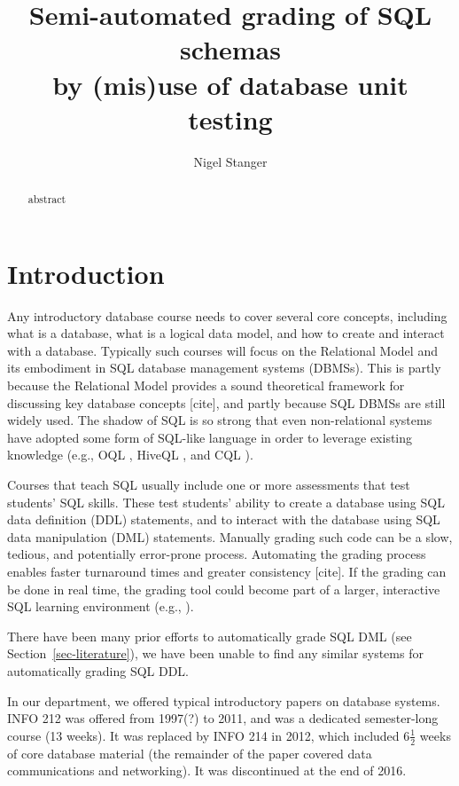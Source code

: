 \documentclass[sigconf, authordraft]{acmart}
\title{Semi-automated grading of SQL schemas \\ by (mis)use of database unit testing}
\author{Nigel Stanger}
\affiliation{
    \institution{University of Otago}
    \department{Department of Information Science}
    \city{Dunedin}
    \country{New Zealand}
}
\begin{document}
\begin{abstract}
    abstract
\end{abstract}

\maketitle


\section{Introduction}

Any introductory database course needs to cover several core concepts, including what is a database, what is a logical data model, and how to create and interact with a database. Typically such courses will focus on the Relational Model and its embodiment in SQL database management systems (DBMSs). This is partly because the Relational Model provides a sound theoretical framework for discussing key database concepts [cite], and partly because SQL DBMSs are still widely used. The shadow of SQL is so strong that even non-relational systems have adopted some form of SQL-like language in order to leverage existing knowledge (e.g., OQL \cite{Cattell.R-2000a-ODMG3}, HiveQL \cite{Apache-2017a-Hive}, and CQL \cite{Apache-2017a-CQL}).

Courses that teach SQL usually include one or more assessments that test students' SQL skills. These test students' ability to 
create a database using SQL data definition (DDL) statements, and to interact with the database using SQL data manipulation (DML) statements. Manually grading such code can be a slow, tedious, and potentially error-prone process. Automating the grading process enables faster turnaround times and greater consistency [cite]. If the grading can be done in real time, the grading tool could become part of a larger, interactive SQL learning environment (e.g.,  \cite{Kenny.C-2005a-Automated,Kleiner.C-2013a-Automated,Mitrovic.A-1998a-Learning,Russell.G-2004a-Improving,Sadiq.S-2004a-SQLator}).

There have been many prior efforts to automatically grade SQL DML (see Section~\ref{sec-literature}), we have been unable to find any similar systems for automatically grading SQL DDL.

In our department, we offered typical introductory papers on database systems. INFO 212 was offered from 1997(?) to 2011, and was a dedicated semester-long course (13 weeks). It was replaced by INFO 214 in 2012, which included 6\(\frac{1}{2}\) weeks of core database material (the remainder of the paper covered data communications and networking). It was discontinued at the end of 2016.
\end{document}
